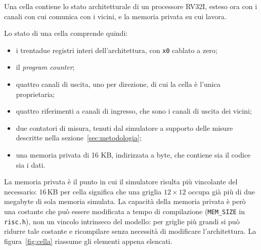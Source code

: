 Una cella contiene lo stato architetturale di un processore RV32I, esteso ora
con i canali con cui comunica con i vicini, e la memoria privata su cui lavora.

Lo stato di una cella comprende quindi:

\begin{itemize}
    \item i trentadue registri interi dell'architettura, con
          \texttt{x0} cablato a zero;
    \item il \emph{program counter};
    \item quattro canali di uscita, uno per direzione, di cui la cella è
          l'unica proprietaria;
    \item quattro riferimenti a canali di ingresso, che sono i canali di
          uscita dei vicini;
    \item due contatori di misura, tenuti dal simulatore a supporto delle misure
          descritte nella sezione~\ref{sec:metodologia};
    \item una memoria privata di 16 KB, indirizzata a byte, che contiene sia il 
          codice sia i dati.
\end{itemize}
La memoria privata è il punto in cui il simulatore risulta più vincolante del necessario:
16\,KB per cella significa che una griglia $12 \times 12$ occupa
già più di due megabyte di sola memoria simulata. La capacità della memoria privata è però una
costante che può essere modificata a tempo di compilazione (\texttt{MEM\_SIZE} in 
\texttt{risc.h}), non un vincolo intrinseco del modello: per griglie più grandi si può 
ridurre tale costante e ricompilare senza necessità di modificare l'architettura. La
figura~\ref{fig:cella} riassume gli elementi appena elencati.

